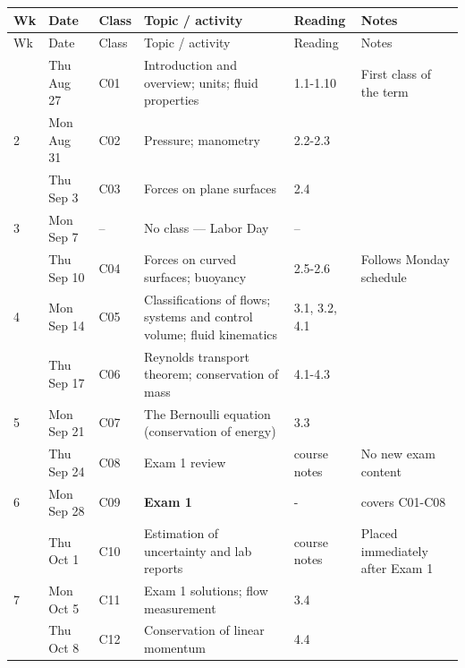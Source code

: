 \begin{longtable}{@{}C{0.027\textwidth} L{0.125\textwidth} C{0.040\textwidth} L{0.360\textwidth} L{0.150\textwidth} L{0.230\textwidth}@{}}
\toprule
Wk & Date & Class & Topic / activity & Reading & Notes \\
\midrule
\endfirsthead
\toprule
Wk & Date & Class & Topic / activity & Reading & Notes \\
\midrule
\endhead
\bottomrule
{} & Thu Aug 27 & C01 & Introduction and overview; units; fluid properties & 1.1-1.10 & {\footnotesize First class of the term} \\
\midrule{}
 2 & Mon Aug 31 & C02 & Pressure; manometry & 2.2-2.3 & {\footnotesize } \\
  & Thu Sep 3 & C03 & Forces on plane surfaces & 2.4 & {\footnotesize } \\
\midrule{}
 3 & Mon Sep 7 & -- & No class --- Labor Day & -- & \\
  & Thu Sep 10 & C04 & Forces on curved surfaces; buoyancy & 2.5-2.6 & {\footnotesize Follows Monday schedule} \\
\midrule{}
 4 & Mon Sep 14 & C05 & Classifications of flows; systems and control volume; fluid kinematics & 3.1, 3.2, 4.1 & {\footnotesize } \\
  & Thu Sep 17 & C06 & Reynolds transport theorem; conservation of mass & 4.1-4.3 & {\footnotesize } \\
\midrule{}
 5 & Mon Sep 21 & C07 & The Bernoulli equation (conservation of energy) & 3.3 & {\footnotesize } \\
  & Thu Sep 24 & C08 & Exam 1 review & course notes & {\footnotesize No new exam content} \\
\midrule{}
 6 & Mon Sep 28 & C09 & \textbf{Exam 1} & - & {\footnotesize covers C01-C08} \\
  & Thu Oct 1 & C10 & Estimation of uncertainty and lab reports & course notes & {\footnotesize Placed immediately after Exam 1} \\
\midrule{}
 7 & Mon Oct 5 & C11 & Exam 1 solutions; flow measurement & 3.4 & {\footnotesize } \\
  & Thu Oct 8 & C12 & Conservation of linear momentum & 4.4 & {\footnotesize } \\

\end{longtable}
